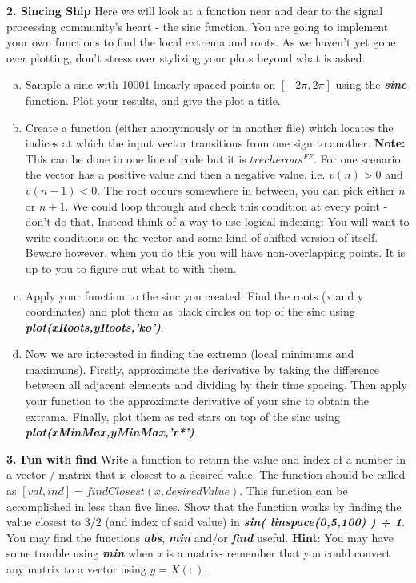 \documentclass[11pt]{article}
\begin{document}
\noindent
\newline
\textbf{2. Sincing Ship} 
Here we will look at a function near and dear to the signal processing community's heart -
the sinc function.
You are going to implement your own functions to find the local extrema and roots.
As we haven't yet gone over plotting,
don't stress over stylizing your plots beyond what is asked.

\begin{enumerate}[a.]
    \item Sample a sinc with 10001 linearly spaced points on $[-2\pi, 2\pi]$ using 
    the \textbf{\textit{sinc}} function. Plot your results, and give the plot a title.

    \item Create a function (either anonymously or in another file) which locates
    the indices at which the input vector transitions from one sign to another.
    \textbf{Note:} This can be done in one line of code but it is $trecherous^{FF}$.
    For one scenario the vector has a positive value and then a negative value,
    i.e. $v(n) > 0$ and $v(n+1) < 0$. 
    The root occurs somewhere in between, you can pick either $n$ or $n+1$.
    We could loop through and check this condition at every point - don't do that.
    Instead think of a way to use logical indexing:
    You will want to write conditions on the vector and some kind of shifted version of itself.
    Beware however, when you do this you will have non-overlapping points.
    It is up to you to figure out what to with them.

    \item Apply your function to the sinc you created.
    Find the roots (x and y coordinates) and plot them as black circles
    on top of the sinc using \textbf{\textit{plot(xRoots,yRoots,'ko')}}. 

    \item Now we are interested in finding the extrema
    (local minimums and maximums).
    Firstly, approximate the derivative by taking the difference between all adjacent elements
    and dividing by their time spacing.
    Then apply your function to the approximate derivative of your sinc to obtain the extrama.
    Finally, plot them as red stars on top of the sinc using \textbf{\textit{plot(xMinMax,yMinMax,'r*')}}.
\end{enumerate}


\noindent
\newline
\textbf{3. Fun with find}
Write a function to return the value and index of a number in a 
vector / matrix that is closest to a desired value.
The function should be called as $[val, ind] = findClosest(x, desiredValue)$.
This function can be accomplished in less than five lines.
Show that the function works by finding the value closest to $3/2$
(and index of said value) in \textbf{\textit{sin( linspace(0,5,100) ) + 1}}.
You may find the functions \textbf{\textit{abs}}, \textbf{\textit{min}} and/or \textbf{\textit{find}} useful.
\textbf{Hint}: You may have some trouble using \textbf{\textit{min}} when \textit{x} is a matrix-
remember that you could convert any matrix to a vector using $y = X(:)$.
\end{document}
